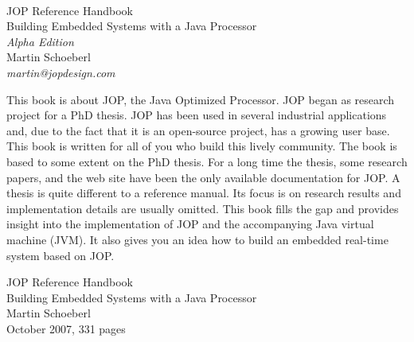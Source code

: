 







\frontmatter \pagestyle{empty}


\begin{flushleft}
\pagestyle{empty}
\ \\
\vspace{1cm}
{\huge JOP Reference Handbook\\
\mdseries
{\Large Building Embedded Systems with a Java Processor}\\
\bigskip
{\large\itshape Alpha Edition}\\
\bigskip
{\Large Martin Schoeberl}
\medskip\\
{\large\itshape martin@jopdesign.com} }


\newpage
\end{flushleft}




This book is about JOP, the Java Optimized Processor. JOP began as
research project for a PhD thesis. JOP has been used in several
industrial applications and, due to the fact that it is an
open-source project, has a growing user base. This book is written
for all of you who build this lively community. The book is based to
some extent on the PhD thesis. For a long time the thesis, some
research papers, and the web site  have been the only available
documentation for JOP. A thesis is quite different to a reference
manual. Its focus is on research results and implementation details
are usually omitted. This book fills the gap and provides insight
into the implementation of JOP and the accompanying Java virtual
machine (JVM). It also gives you an idea how to build an embedded
real-time system based on JOP.

\begin{flushleft}

\vspace{10cm}
JOP Reference Handbook\\
Building Embedded Systems with a Java Processor\\
Martin Schoeberl\\
October 2007, 331 pages
\end{flushleft}


